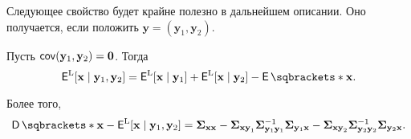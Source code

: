 Следующее свойство будет крайне полезно в дальнейшем описании. Оно получается, 
если положить \(\mathbf{y} = (\mathbf{y}_{1}, \mathbf{y}_{2})\).
\begin{property}
	Пусть \(\operatorname{\mathsf{cov}}(\mathbf{y}_{1}, \mathbf{y}_{2}) = \mathbf{0}\). Тогда
	\[
		\E^{\mathrm{L}}[\mathbf{x} \mid \mathbf{y}_{1}, \mathbf{y}_{2}] = 
		\E^{\mathrm{L}}[\mathbf{x} \mid \mathbf{y}_{1}] + 
		\E^{\mathrm{L}}[\mathbf{x} \mid \mathbf{y}_{2}] - \E{\mathbf{x}}.
	\]
	
	Более того,
	\[
		\D{\mathbf{x} - \E^{\mathrm{L}}[\mathbf{x} \mid \mathbf{y}_{1}, 
		\mathbf{y}_{2}]} = \bm{\Sigma}_{\mathbf{xx}} - 
		\bm{\Sigma}_{\mathbf{xy}_{1}} 
		\bm{\Sigma}_{\mathbf{y}_{1}\mathbf{y}_{1}}^{-1} 
		\bm{\Sigma}_{\mathbf{y}_{1}\mathbf{x}} - 
		\bm{\Sigma}_{\mathbf{xy}_{2}} 
		\bm{\Sigma}_{\mathbf{y}_{2}\mathbf{y}_{2}}^{-1} 
		\bm{\Sigma}_{\mathbf{y}_{2}\mathbf{x}}.
	\]
\end{property}
